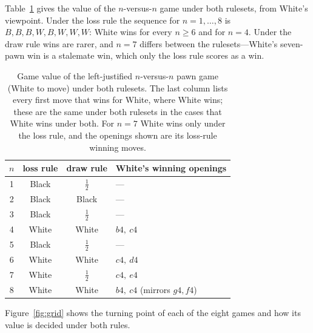 \documentclass[11pt]{article}
\theoremstyle{plain}
\theoremstyle{definition}
\newcommand{\resLoss}{$B,B,B,W,B,W,W,W$}
\newcommand{\nEightDrawResult}{White}
\begin{document}
Table~\ref{tab:results} gives the value of the $n$-versus-$n$ game under both
rulesets, from White's viewpoint. Under the loss rule the sequence for
$n=1,\dots,8$ is \resLoss: White wins for every $n\ge 6$ and for $n=4$. Under the
draw rule wins are rarer, and $n=7$ differs between the rulesets---White's
seven-pawn win is a stalemate win, which only the loss rule scores as a win.

\begin{table}[t]
\centering
\begin{tabular}{cccl}
\toprule
$n$ & loss rule & draw rule & White's winning openings \\
\midrule
1 & Black & $\tfrac12$ & --- \\
2 & Black & Black & --- \\
3 & Black & $\tfrac12$ & --- \\
4 & White & White & $b4,\ c4$ \\
5 & Black & $\tfrac12$ & --- \\
6 & White & White & $c4,\ d4$ \\
7 & White & $\tfrac12$ & $c4,\ e4$ \\
8 & White & \nEightDrawResult & $b4,\ c4$ (mirrors $g4,f4$) \\
\bottomrule
\end{tabular}
\caption{Game value of the left-justified $n$-versus-$n$ pawn game (White to
move) under both rulesets. The last column lists every first move that wins for
White, where White wins; these are the same under both rulesets in the cases that
White wins under both. For $n=7$ White wins only under the loss rule, and the
openings shown are its loss-rule winning moves.}
\label{tab:results}
\end{table}

Figure~\ref{fig:grid} shows the turning point of each of the eight games and how
its value is decided under both rules.
\end{document}
